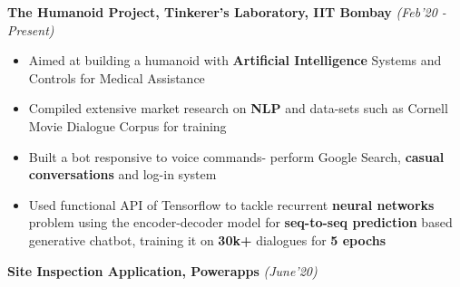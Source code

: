\documentclass[10.5pt]{article}
\begin{document}


  \vspace{0pt}
  \textbf{The Humanoid Project, Tinkerer's Laboratory, IIT Bombay} \hfill{\sl\small(Feb'20 - Present)}\\
  
  \begin{itemize}[itemsep=-0.5mm, leftmargin=*]
  \vspace{-18pt}
      \item Aimed at building a humanoid with \textbf{Artificial Intelligence} Systems and Controls for Medical Assistance 
     
      \item Compiled extensive market research on \textbf{NLP} and data-sets such as Cornell Movie Dialogue Corpus for training   
     
      \item Built a bot responsive to voice commands- perform Google Search, \textbf{casual conversations} and log-in system
     
      \item Used functional API of Tensorflow to tackle recurrent \textbf{neural networks} problem using the encoder-decoder model for \textbf{seq-to-seq prediction} based generative chatbot, training it on \textbf{30k+} dialogues for \textbf{5 epochs} 
      
     
     
  \end{itemize}
  
  \vspace{-5 pt}
  \hspace{-18 pt}
  \textbf{Site Inspection Application, Powerapps} \hfill{\sl\small (June'20)}\\
    
\end{document}
